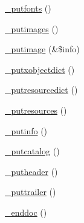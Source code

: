 \begin{DoxyCompactItemize}
\hyperlink{class_f_p_d_f_a4ae04c17a87a0d5bdd0c366a08490389}{\+\_\+putfonts} ()
\item 
\hyperlink{class_f_p_d_f_a8373f5b9e6f6f9878fa71c4344fea6e7}{\+\_\+putimages} ()
\item 
\hyperlink{class_f_p_d_f_aa1f0ef0466346805f2a90088a630698b}{\+\_\+putimage} (\&\$info)
\item 
\hyperlink{class_f_p_d_f_af867752b75e6f3ab801d04361af975a1}{\+\_\+putxobjectdict} ()
\item 
\hyperlink{class_f_p_d_f_ab8cbd28b1ef8067cd94b2ff742001889}{\+\_\+putresourcedict} ()
\item 
\hyperlink{class_f_p_d_f_acb19da5e6521ac1e0f3472a74f5674c3}{\+\_\+putresources} ()
\item 
\hyperlink{class_f_p_d_f_a6ae7e6d0a2180ed00042fb86d39c03ba}{\+\_\+putinfo} ()
\item 
\hyperlink{class_f_p_d_f_a02167c095457b931f89d6be819d33286}{\+\_\+putcatalog} ()
\item 
\hyperlink{class_f_p_d_f_af225d15cefae5f606b0a1788414b279e}{\+\_\+putheader} ()
\item 
\hyperlink{class_f_p_d_f_a856d3f96eb0a42747ed5090c89673279}{\+\_\+puttrailer} ()
\item 
\hyperlink{class_f_p_d_f_ad83ac6a1b1122bcf6fd1fee89e530257}{\+\_\+enddoc} ()
\end{DoxyCompactItemize}
